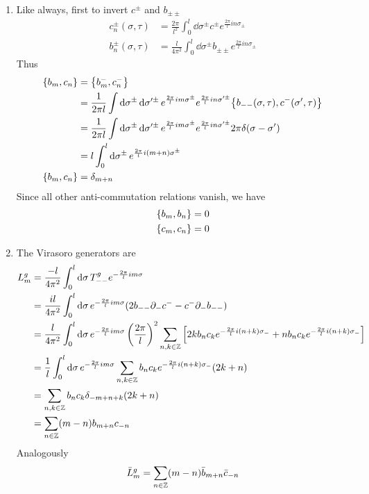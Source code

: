 \begin{enumerate}[label=(\alph*)]
	\item Like always, first to invert  $c^\pm$ and $b_{\pm\pm}$
		\begin{align}
			c_{n}^\pm(\sigma,\tau) &= \frac{2\pi}{l^2} \int_0^{l} \dd{\sigma^\pm} c^\pm e^{\frac{2\pi}{l} i n \sigma_\pm} \\
			b_{n}^\pm (\sigma,\tau)&= \frac{l}{4\pi^2} \int_0^{l} \dd{\sigma^\pm} b_{\pm\pm} e^{\frac{2\pi}{l} i n \sigma_\pm}
		\end{align}
		Thus
		\begin{align}
			\acomm{b_m}{c_n} &= \acomm{b^-_m}{c^-_n} \notag \\
								  &= \frac{1}{2\pi l} \int \dd{\sigma^{\pm}} \dd{\sigma'^{\pm}} e^{\frac{2\pi}{l} im \sigma^\pm}e^{\frac{2\pi}{l} in \sigma'^\pm} \acomm{b_{--}(\sigma,\tau)}{c^-(\sigma',\tau)} \notag \\
								  &= \frac{1}{2\pi l} \int \dd{\sigma^{\pm}} \dd{\sigma'^{\pm}} e^{\frac{2\pi}{l} im \sigma^\pm} e^{\frac{2\pi}{l} in \sigma'^\pm} 2\pi \delta(\sigma-\sigma') \notag \\
								  &=  l \int_0^l \dd{\sigma^{\pm}}  e^{\frac{2\pi}{l} i(m+n) \sigma^\pm}  \notag \\
				\acomm{b_m}{c_n}&=  \delta_{m+n}
		\end{align}
		Since all other anti-commutation relations vanish, we have
		\begin{align}
			\acomm{b_m}{b_n} &= 0 \\
			\acomm{c_m}{c_n} &= 0
		\end{align}

	\item The Virasoro generators are
		\begin{align*}
			L^g_m &= \frac{-l}{4\pi^2} \int_0^l \dd{\sigma} T^g_{--} e^{- \frac{2\pi}{l} im\sigma}	 \\
					&= \frac{i l}{4\pi^2} \int_0^l \dd{\sigma}  e^{- \frac{2\pi}{l} im\sigma}	(2b_{--}\partial_- c^- - c^- \partial_- b_{--}) \\ 
					&= \frac{l}{4\pi^2} \int_0^l \dd{\sigma}  e^{- \frac{2\pi}{l} im\sigma} \left( \frac{2\pi}{l} \right)^2 \sum_{n,k\in\mathbb{Z}}\left[ 2k b_n c_k e^{- \frac{2\pi}{l}i(n+k)\sigma_-}  + n  b_n c_k e^{-\frac{2\pi}{l}i(n+k)\sigma_-}  \right] \\
					&= \frac{1}{l} \int_0^l \dd{\sigma} e^{- \frac{2\pi}{l} im\sigma} \sum_{n,k\in\mathbb{Z}} b_n c_k e^{-\frac{2\pi}{l}i(n+k)\sigma_-} (2k + n) \\
					&= \sum_{n,k\in\mathbb{Z}} b_n c_k \delta_{-m+n+k} (2k+n) \\
					&= \sum_{n\in\mathbb{Z}} (m-n) b_{m+n} c_{-n}
		\end{align*}
		Analogously
		\begin{equation}
			\bar{L}^g_{m} = \sum_{n\in\mathbb{Z}} (m-n) \bar{b}_{m+n} \bar{c}_{-n}
		\end{equation}


\end{enumerate}

